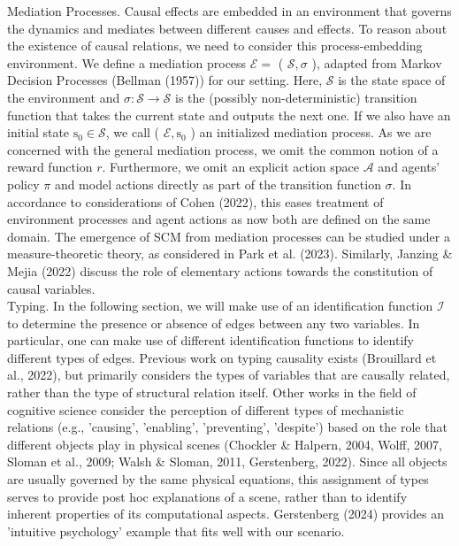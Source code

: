 \documentclass[10pt]{article}
\begin{document}
Mediation Processes. Causal effects are embedded in an environment that governs the dynamics and mediates between different causes and effects. To reason about the existence of causal relations, we need to consider this process-embedding environment. We define a mediation process $\mathcal{E}=$ ( $\mathcal{S}, \sigma$ ), adapted from Markov Decision Processes (Bellman (1957)) for our setting. Here, $\mathcal{S}$ is the state space of the environment and $\sigma: \mathcal{S} \rightarrow \mathcal{S}$ is the (possibly non-deterministic) transition function that takes the current state and outputs the next one. If we also have an initial state $\mathrm{s}_{0} \in \mathcal{S}$, we call ( $\mathcal{E}, \mathrm{s}_{0}$ ) an initialized mediation process. As we are concerned with the general mediation process, we omit the common notion of a reward function $r$. Furthermore, we omit an explicit action space $\mathcal{A}$ and agents' policy $\pi$ and model actions directly as part of the transition function $\sigma$. In accordance to considerations of Cohen (2022), this eases treatment of environment processes and agent actions as now both are defined on the same domain. The emergence of SCM from mediation processes can be studied under a measure-theoretic theory, as considered in Park et al. (2023). Similarly, Janzing \& Mejia (2022) discuss the role of elementary actions towards the constitution of causal variables.\\
Typing. In the following section, we will make use of an identification function $\mathcal{I}$ to determine the presence or absence of edges between any two variables. In particular, one can make use of different identification functions to identify different types of edges. Previous work on typing causality exists (Brouillard et al., 2022), but primarily considers the types of variables that are causally related, rather than the type of structural relation itself. Other works in the field of cognitive science consider the perception of different types of mechanistic relations (e.g., 'causing', 'enabling', 'preventing', 'despite') based on the role that different objects play in physical scenes (Chockler \& Halpern, 2004, Wolff, 2007, Sloman et al., 2009; Walsh \& Sloman, 2011, Gerstenberg, 2022). Since all objects are usually governed by the same physical equations, this assignment of types serves to provide post hoc explanations of a scene, rather than to identify inherent properties of its computational aspects. Gerstenberg (2024) provides an 'intuitive psychology' example that fits well with our scenario.
\end{document}
